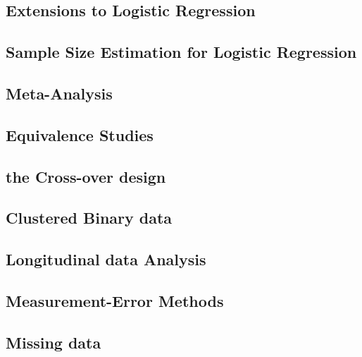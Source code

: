 \documentclass[12pt,]{article}
\begin{document}
\hypertarget{extensions-to-logistic-regression}{%
\subsection{Extensions to Logistic
Regression}\label{extensions-to-logistic-regression}}

\hypertarget{sample-size-estimation-for-logistic-regression}{%
\subsection{Sample Size Estimation for Logistic
Regression}\label{sample-size-estimation-for-logistic-regression}}

\hypertarget{meta-analysis}{%
\subsection{Meta-Analysis}\label{meta-analysis}}

\hypertarget{equivalence-studies}{%
\subsection{Equivalence Studies}\label{equivalence-studies}}

\hypertarget{the-cross-over-design}{%
\subsection{the Cross-over design}\label{the-cross-over-design}}

\hypertarget{clustered-binary-data}{%
\subsection{Clustered Binary data}\label{clustered-binary-data}}

\hypertarget{longitudinal-data-analysis}{%
\subsection{Longitudinal data
Analysis}\label{longitudinal-data-analysis}}

\hypertarget{measurement-error-methods}{%
\subsection{Measurement-Error Methods}\label{measurement-error-methods}}

\hypertarget{missing-data}{%
\subsection{Missing data}\label{missing-data}}
\end{document}
